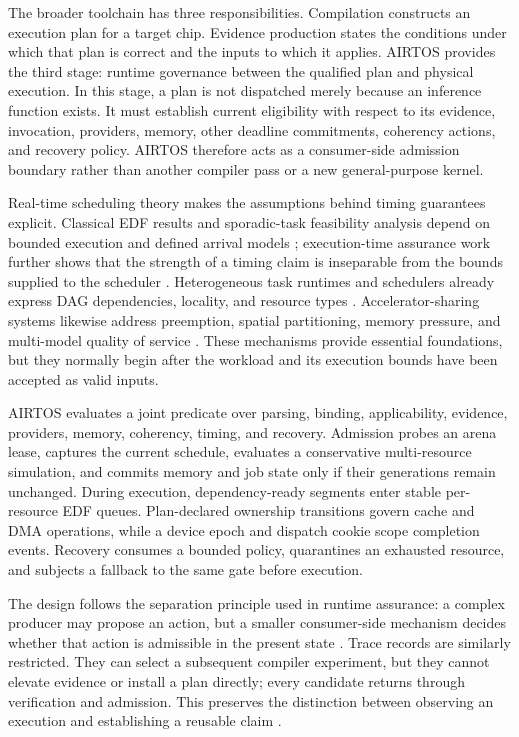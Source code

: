 \documentclass[lettersize,journal]{IEEEtran}
\begin{document}
The broader toolchain has three responsibilities. Compilation constructs an
execution plan for a target chip. Evidence production states the conditions
under which that plan is correct and the inputs to which it applies. AIRTOS
provides the third stage: runtime governance between the qualified plan and
physical execution. In this stage, a plan is not dispatched merely because an
inference function exists. It must establish current eligibility with respect
to its evidence, invocation, providers, memory, other deadline commitments,
coherency actions, and recovery policy. AIRTOS therefore acts as a
consumer-side admission boundary rather than another compiler pass or a new
general-purpose kernel.

Real-time scheduling theory makes the assumptions behind timing guarantees
explicit. Classical EDF results and sporadic-task feasibility analysis depend
on bounded execution and defined arrival models
\cite{liu1973scheduling,baruah1990preemptively}; execution-time assurance work
further shows that the strength of a timing claim is inseparable from the
bounds supplied to the scheduler \cite{vestal2007preemptive}. Heterogeneous
task runtimes and schedulers already express DAG dependencies, locality, and
resource types \cite{topcuoglu2002performanceeffective,augonnet2011starpu,
bauer2012legion,rossbach2011ptask,lin2022typeaware}. Accelerator-sharing
systems likewise address preemption, spatial partitioning, memory pressure,
and multi-model quality of service
\cite{choi2020prema,ghodrati2020planaria,kim2023moca,kim2023dream}. These
mechanisms provide essential foundations, but they normally begin after the
workload and its execution bounds have been accepted as valid inputs.

AIRTOS evaluates a joint predicate over parsing, binding, applicability,
evidence, providers, memory, coherency, timing, and recovery. Admission probes
an arena lease, captures the current schedule, evaluates a conservative
multi-resource simulation, and commits memory and job state only if their
generations remain unchanged. During execution, dependency-ready segments
enter stable per-resource EDF queues. Plan-declared ownership transitions
govern cache and DMA operations, while a device epoch and dispatch cookie
scope completion events. Recovery consumes a bounded policy, quarantines an
exhausted resource, and subjects a fallback to the same gate before execution.

The design follows the separation principle used in runtime assurance: a
complex producer may propose an action, but a smaller consumer-side mechanism
decides whether that action is admissible in the present state
\cite{seto1998simplex,hobbs2023runtime}. Trace records are similarly
restricted. They can select a subsequent compiler experiment, but they cannot
elevate evidence or install a plan directly; every candidate returns through
verification and admission. This preserves the distinction between observing
an execution and establishing a reusable claim \cite{leucker2009brief}.
\end{document}
